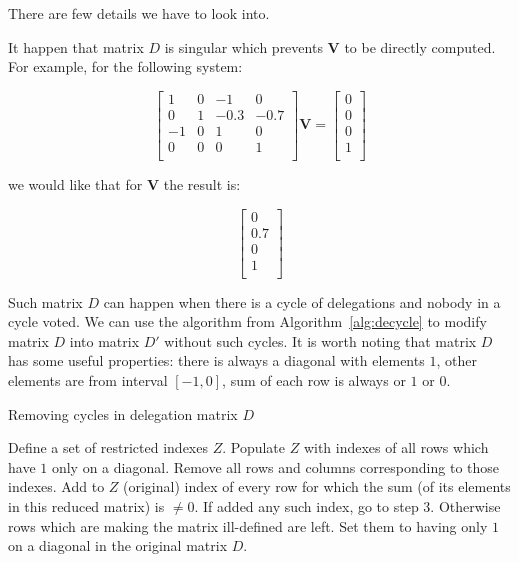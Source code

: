 \documentclass{sigchi}
\begin{document}
There are few details we have to look into.

It happen that matrix $D$ is singular which prevents $\boldsymbol{V}$ to be directly computed.
For example, for the following system:

\begin{displaymath}
\left[ \begin{array}{ccccc}
1 & 0 & -1 & 0 \\
0 & 1 & -0.3 & -0.7 \\
-1 & 0 & 1 & 0 \\
0 & 0 & 0 & 1\\
\end{array} \right] \boldsymbol{V} = \left[ \begin{array}{c}
0 \\
0 \\
0 \\
1 \\
\end{array} \right]
\end{displaymath}

we would like that for $\boldsymbol{V}$ the result is:

\begin{displaymath}
\left[ \begin{array}{c}
0 \\
0.7 \\
0 \\
1 \\
\end{array} \right]
\end{displaymath}

Such matrix $D$ can happen when there is a cycle of delegations and nobody in a cycle
voted.
We can use the algorithm from Algorithm~\ref{alg:decycle} to modify matrix $D$ into
matrix $D'$ without such cycles.
It is worth noting that matrix $D$ has some useful properties:
there is always a diagonal with elements $1$, other elements are from interval $[−1,0]$,
sum of each row is always or $1$ or $0$.

\begin{algorithm}[h]
  \caption{Removing cycles in delegation matrix $D$}
  \begin{algorithmic}[1]
    \State Define a set of restricted indexes $Z$.
    \State Populate $Z$ with indexes of all rows which have $1$ only on a diagonal.\footnotemark
    \State Remove all rows and columns corresponding to those indexes.
    \State Add to $Z$ (original) index of every row for which the sum (of its elements in this reduced matrix) is $\neq 0$.
    \State If added any such index, go to step 3.
    \State Otherwise rows which are making the matrix ill-defined are left. Set them to having only $1$ on a diagonal in the original matrix $D$.
  \end{algorithmic}
  \label{alg:decycle}
\end{algorithm}
\end{document}
